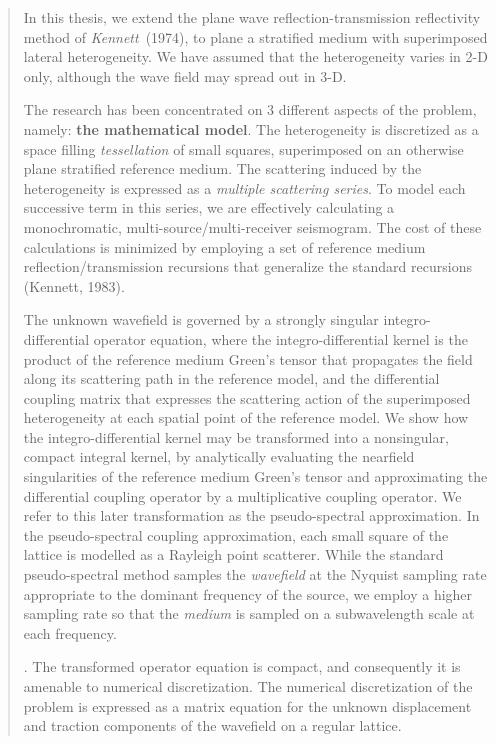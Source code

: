 \begin{samepage}
\begin{abstract}
\setcounter{page}{4}


In this thesis, we extend the plane wave reflection-transmission reflectivity method of 
{\em Kennett\/}~(1974), to plane a stratified medium with superimposed lateral heterogeneity.
We have assumed that the heterogeneity 
varies in 2-D only, although the wave field may spread out in 3-D. 

 The research 
has been concentrated on $3$ different aspects of the problem, namely:
{\bf the mathematical model}. The heterogeneity is discretized as a space filling {\em tessellation\/} of 
small squares, superimposed on an otherwise plane stratified reference medium. 
The scattering induced by the heterogeneity is expressed as a 
{\em multiple scattering series\/}. To model each successive term in this series, 
we are effectively calculating a monochromatic, multi-source/multi-receiver seismogram.
The cost of these calculations is minimized by employing a set of reference medium
reflection/transmission  recursions that generalize the standard recursions
(Kennett, 1983).

The unknown wavefield is governed by a strongly singular
integro-differential operator equation, where the integro-differential kernel is the 
product of the reference medium 
Green's tensor that propagates the field along its scattering path in the reference model, 
and the differential 
coupling matrix that expresses the scattering action of the superimposed heterogeneity at each 
spatial point of the reference model.  We show how the integro-differential kernel may be 
transformed into a nonsingular, compact integral kernel, by analytically evaluating the
 nearfield singularities of the reference medium Green's tensor and approximating the 
differential coupling operator by a multiplicative  coupling operator. We refer to this 
later transformation as the pseudo-spectral approximation. In the pseudo-spectral coupling 
approximation, each small square of the lattice is modelled as a Rayleigh point scatterer.
While the standard pseudo-spectral method samples the {\em wavefield\/} at the Nyquist 
sampling rate appropriate to the dominant frequency of the source, we employ a higher sampling rate
so that the {\em medium\/} is sampled on a subwavelength scale at each frequency. 
   

. The transformed operator equation is compact, 
and consequently it is 
amenable to numerical discretization. The numerical discretization of the problem is 
expressed as a matrix equation for the unknown displacement and traction components of 
the wavefield on a regular lattice. 


\end{abstract}
\end{samepage}
